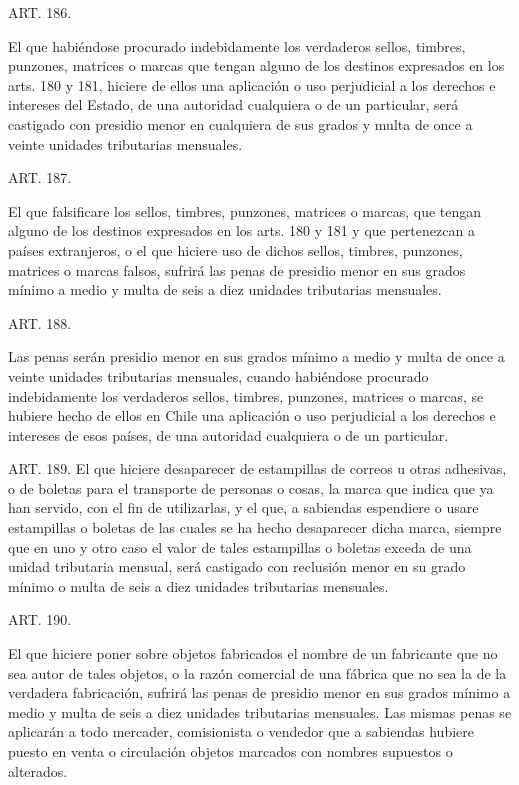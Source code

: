     ART. 186.

    El que habiéndose procurado indebidamente los verdaderos sellos, timbres, punzones, matrices o marcas que tengan alguno de los destinos expresados en los arts. 180 y 181, hiciere de ellos una aplicación o uso perjudicial a los derechos e intereses del Estado, de una autoridad cualquiera o de un particular, será castigado con presidio menor en cualquiera de sus grados y multa de once a veinte unidades tributarias mensuales.








    ART. 187.

    El que falsificare los sellos, timbres, punzones, matrices o marcas, que tengan alguno de los destinos expresados en los arts. 180 y 181 y que pertenezcan a países extranjeros, o el que hiciere uso de dichos sellos, timbres, punzones, matrices o marcas falsos, sufrirá las penas de presidio menor en sus grados mínimo a medio y multa de seis a diez unidades tributarias mensuales.








    ART. 188.

    Las penas serán presidio menor en sus grados mínimo a medio y multa de once a veinte unidades tributarias mensuales, cuando habiéndose procurado indebidamente los verdaderos sellos, timbres, punzones, matrices o marcas, se hubiere hecho de ellos en Chile una aplicación o uso perjudicial a los derechos e intereses de esos países, de una autoridad cualquiera o de un particular.




      ART. 189.
      El que hiciere desaparecer de estampillas de correos u otras adhesivas, o de boletas para el transporte de personas o cosas, la marca que indica que ya han servido, con el fin de utilizarlas, y el que, a sabiendas espendiere o usare estampillas o boletas de las cuales se ha hecho desaparecer dicha marca, siempre que en uno y otro caso el valor de tales estampillas o boletas exceda de una unidad tributaria mensual, será castigado con reclusión menor en su grado mínimo o multa de seis a diez unidades tributarias mensuales.






    ART. 190.

    El que hiciere poner sobre objetos fabricados el nombre de un fabricante que no sea autor de tales objetos, o la razón comercial de una fábrica que no sea la de la verdadera fabricación, sufrirá las penas de presidio menor en sus grados mínimo a medio y multa de seis a diez unidades tributarias mensuales.
    Las mismas penas se aplicarán a todo mercader, comisionista o vendedor que a sabiendas hubiere puesto en venta o circulación objetos marcados con nombres supuestos o alterados.





